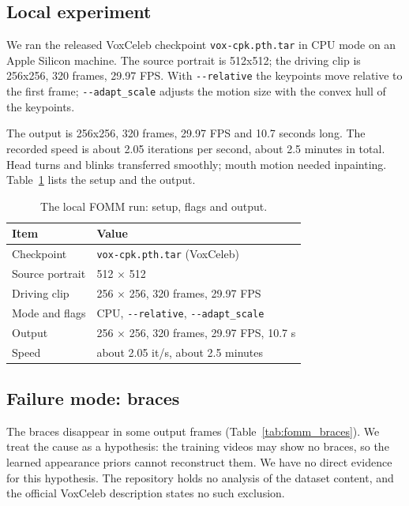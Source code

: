 

\subsection{Local experiment}
We ran the released VoxCeleb checkpoint \texttt{vox-cpk.pth.tar} in CPU mode on
an Apple Silicon machine. The source portrait is 512x512; the driving clip is
256x256, 320 frames, 29.97 FPS. With \texttt{-{}-relative} the keypoints move
relative to the first frame; \texttt{-{}-adapt\_scale} adjusts the motion size
with the convex hull of the keypoints.

The output is 256x256, 320 frames, 29.97 FPS and 10.7 seconds long. The recorded
speed is about 2.05 iterations per second, about 2.5 minutes in total. Head
turns and blinks transferred smoothly; mouth motion needed inpainting.
Table~\ref{tab:fomm_run} lists the setup and the output.

\begin{table}[tb]
  \centering
  \footnotesize
  \begin{tabular}{@{}l l@{}}
    \toprule
    Item & Value \\
    \midrule
    Checkpoint & \texttt{vox-cpk.pth.tar} (VoxCeleb) \\
    Source portrait & 512 $\times$ 512 \\
    Driving clip & 256 $\times$ 256, 320 frames, 29.97 FPS \\
    Mode and flags & CPU, \texttt{-{}-relative}, \texttt{-{}-adapt\_scale} \\
    Output & 256 $\times$ 256, 320 frames, 29.97 FPS, 10.7 s \\
    Speed & about 2.05 it/s, about 2.5 minutes \\
    \bottomrule
  \end{tabular}
  \caption{The local FOMM run: setup, flags and output.}
  \label{tab:fomm_run}
\end{table}

\subsection{Failure mode: braces}
The braces disappear in some output frames (Table~\ref{tab:fomm_braces}). We
treat the cause as a hypothesis: the training videos may show no braces, so the
learned appearance priors cannot reconstruct them. We have no direct evidence
for this hypothesis. The repository holds no analysis of the dataset content,
and the official VoxCeleb description states no such exclusion.

